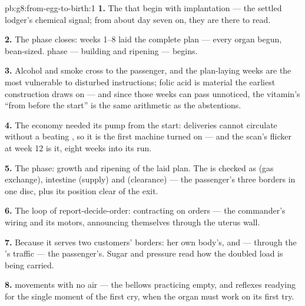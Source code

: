\begin{solution}{pb:g8:from-egg-to-birth:1}
\textbf{1.} The   that begin with
implantation --- the settled lodger's chemical signal;
from about day seven on, they are there to read.

\textbf{2.} The  phase closes: weeks 1--8 laid the
complete plan --- every organ begun, bean-sized. 
phase --- building and ripening --- begins.

\textbf{3.} Alcohol and smoke cross to the passenger, and
the plan-laying weeks are the most vulnerable to disturbed
instructions; folic acid is material the earliest
construction draws on --- and since those weeks can pass
unnoticed, the vitamin's ``from before the start'' is the
same arithmetic as the abstentions.

\textbf{4.} The  economy needed its pump from the
start: deliveries cannot circulate without a beating
, so it is the first machine turned on --- and the
scan's flicker at week 12 is it, eight weeks into its
run.

\textbf{5.} The  phase: growth and ripening of the
laid plan. The  is checked as  (gas
exchange), intestine (supply) and  (clearance) ---
the passenger's three borders in one disc, plus its
position clear of the exit.

\textbf{6.} The loop of report-decide-order: 
contracting on  orders --- the commander's wiring
and its motors, announcing themselves through the uterus
wall.

\textbf{7.} Because it serves two customers' borders: her
own body's, and --- through the 's traffic ---
the passenger's. Sugar and pressure read how the doubled
load is being carried.

\textbf{8.}  movements with no air --- the
bellows practicing empty,  and reflexes readying
for the single moment of the first cry, when the organ
must work on its first try.


\end{solution}
